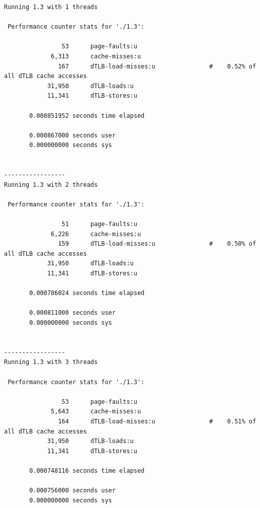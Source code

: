 \documentclass{article}
\begin{document}
\begin{latin}
\begin{lstlisting}
Running 1.3 with 1 threads

 Performance counter stats for './1.3':

                53      page-faults:u                                                         
             6,313      cache-misses:u                                                        
               167      dTLB-load-misses:u               #    0.52% of all dTLB cache accesses
            31,950      dTLB-loads:u                                                          
            11,341      dTLB-stores:u                                                         

       0.000851952 seconds time elapsed

       0.000867000 seconds user
       0.000000000 seconds sys


-----------------
Running 1.3 with 2 threads

 Performance counter stats for './1.3':

                51      page-faults:u                                                         
             6,226      cache-misses:u                                                        
               159      dTLB-load-misses:u               #    0.50% of all dTLB cache accesses
            31,950      dTLB-loads:u                                                          
            11,341      dTLB-stores:u                                                         

       0.000786024 seconds time elapsed

       0.000811000 seconds user
       0.000000000 seconds sys


-----------------
Running 1.3 with 3 threads

 Performance counter stats for './1.3':

                53      page-faults:u                                                         
             5,643      cache-misses:u                                                        
               164      dTLB-load-misses:u               #    0.51% of all dTLB cache accesses
            31,950      dTLB-loads:u                                                          
            11,341      dTLB-stores:u                                                         

       0.000748116 seconds time elapsed

       0.000756000 seconds user
       0.000000000 seconds sys



\end{lstlisting}
\end{latin}
\end{document}
